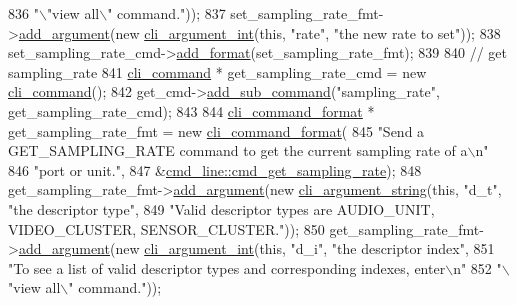 \begin{DoxyCode}
836                                                              \textcolor{stringliteral}{"\(\backslash\)"view all\(\backslash\)" command."}));
837     set\_sampling\_rate\_fmt->\hyperlink{classcli__command__format_ac3fc6d13a227c195d5ee6f7b78eba9cd}{add\_argument}(\textcolor{keyword}{new} \hyperlink{classcli__argument__int}{cli\_argument\_int}(\textcolor{keyword}{this}, \textcolor{stringliteral}{"rate"}, \textcolor{stringliteral}{"the
       new rate to set"}));
838     set\_sampling\_rate\_cmd->\hyperlink{classcli__command_aa9ec38e761644d946f8db2b920e39921}{add\_format}(set\_sampling\_rate\_fmt);
839 
840     \textcolor{comment}{// get sampling\_rate}
841     \hyperlink{classcli__command}{cli\_command} * get\_sampling\_rate\_cmd = \textcolor{keyword}{new} \hyperlink{classcli__command}{cli\_command}();
842     get\_cmd->\hyperlink{classcli__command_aa73a67e8ebb6facd4b40ced66279b226}{add\_sub\_command}(\textcolor{stringliteral}{"sampling\_rate"}, get\_sampling\_rate\_cmd);
843 
844     \hyperlink{classcli__command__format}{cli\_command\_format} * get\_sampling\_rate\_fmt = \textcolor{keyword}{new} 
      \hyperlink{classcli__command__format}{cli\_command\_format}(
845         \textcolor{stringliteral}{"Send a GET\_SAMPLING\_RATE command to get the current sampling rate of a\(\backslash\)n"}
846         \textcolor{stringliteral}{"port or unit."},
847         &\hyperlink{classcmd__line_a301f6afb5cbc6caa761c11096f9d5c96}{cmd\_line::cmd\_get\_sampling\_rate});
848     get\_sampling\_rate\_fmt->\hyperlink{classcli__command__format_ac3fc6d13a227c195d5ee6f7b78eba9cd}{add\_argument}(\textcolor{keyword}{new} \hyperlink{classcli__argument__string}{cli\_argument\_string}(\textcolor{keyword}{this}, \textcolor{stringliteral}{"d\_t"},
       \textcolor{stringliteral}{"the descriptor type"},
849                                                                 \textcolor{stringliteral}{"Valid descriptor types are AUDIO\_UNIT,
       VIDEO\_CLUSTER, SENSOR\_CLUSTER."}));
850     get\_sampling\_rate\_fmt->\hyperlink{classcli__command__format_ac3fc6d13a227c195d5ee6f7b78eba9cd}{add\_argument}(\textcolor{keyword}{new} \hyperlink{classcli__argument__int}{cli\_argument\_int}(\textcolor{keyword}{this}, \textcolor{stringliteral}{"d\_i"}, \textcolor{stringliteral}{"the
       descriptor index"},
851                                                              \textcolor{stringliteral}{"To see a list of valid descriptor types and
       corresponding indexes, enter\(\backslash\)n"}
852                                                              \textcolor{stringliteral}{"\(\backslash\)"view all\(\backslash\)" command."}));

\end{DoxyCode}
